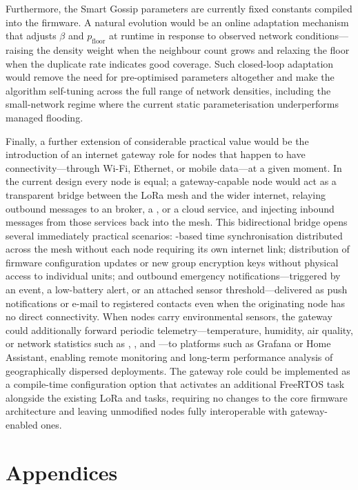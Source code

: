 \documentclass[english,bachelor]{tfgitic}[2026/01/22]
\begin{document}
Furthermore, the Smart Gossip parameters are currently fixed constants compiled into the firmware. A natural evolution would be an online adaptation mechanism that adjusts $\beta$ and $p_{\text{floor}}$ at runtime in response to observed network conditions---raising the density weight when the neighbour count grows and relaxing the floor when the duplicate rate indicates good coverage. Such closed-loop adaptation would remove the need for pre-optimised parameters altogether and make the algorithm self-tuning across the full range of network densities, including the small-network regime where the current static parameterisation underperforms managed flooding.

Finally, a further extension of considerable practical value would be the introduction of an internet gateway role for nodes that happen to have connectivity---through Wi-Fi, Ethernet, or mobile data---at a given moment. In the current design every node is equal; a gateway-capable node would act as a transparent bridge between the LoRa mesh and the wider internet, relaying outbound messages to an  broker, a  , or a cloud service, and injecting inbound messages from those services back into the mesh. This bidirectional bridge opens several immediately practical scenarios: -based time synchronisation distributed across the mesh without each node requiring its own internet link; distribution of firmware configuration updates or new group encryption keys without physical access to individual units; and outbound emergency notifications---triggered by an  event, a low-battery alert, or an attached sensor threshold---delivered as push notifications or e-mail to registered contacts even when the originating node has no direct connectivity. When nodes carry environmental sensors, the gateway could additionally forward periodic telemetry---temperature, humidity, air quality, or network statistics such as , , and ---to platforms such as Grafana or Home Assistant, enabling remote monitoring and long-term performance analysis of geographically dispersed deployments. The gateway role could be implemented as a compile-time configuration option that activates an additional FreeRTOS task alongside the existing LoRa and  tasks, requiring no changes to the core firmware architecture and leaving unmodified nodes fully interoperable with gateway-enabled ones.

\printbibliography

\appendix
\part{Appendices}
\end{document}
